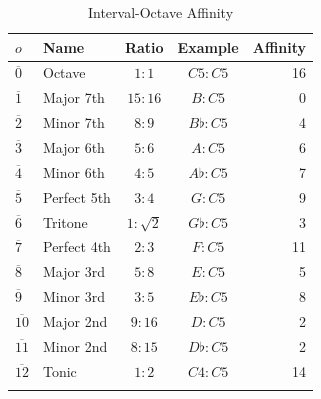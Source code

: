 \documentclass[sn-mathphys]{sn-jnl}%
\begin{document}
\begin{table}[h]
  \begin{center}
    \begin{minipage}{174pt}
      \caption{Interval-Octave Affinity}\label{tab1}%
      \begin{tabular}{@{}llccr@{}}
        \toprule
        $o$ \footnotemark[1] & Name  & Ratio \footnotemark[2] & Example & Affinity  \\
        \midrule
        $\overline{0}$ & Octave & $1:1$ & $C5:C5$ & 16 \\
        $\overline{1}$ & Major 7th & $15:16$ & $B:C5$ & 0 \\
        $\overline{2}$ & Minor 7th & $8:9$ & $B\flat:C5$ & 4 \\
        $\overline{3}$ & Major 6th & $5:6$ & $A:C5$ & 6 \\
        $\overline{4}$ & Minor 6th & $4:5$ & $A\flat:C5$ & 7 \\
        $\overline{5}$ & Perfect 5th & $3:4$ & $G:C5$ & 9 \\
        $\overline{6}$ & Tritone \footnotemark[3] & $1:\sqrt{2} $ & $G\flat:C5$ & 3 \\
        $\overline{7}$ & Perfect 4th & $2:3$ & $F:C5$ & 11 \\
        $\overline{8}$ & Major 3rd & $5:8$ & $E:C5$ & 5 \\
        $\overline{9}$ & Minor 3rd & $3:5$ & $E\flat:C5$ & 8 \\
        $\overline{10}$ & Major 2nd & $9:16$ & $D:C5$ & 2 \\
        $\overline{11}$ & Minor 2nd & $8:15$ & $D\flat:C5$ & 2 \\
        $\overline{12}$ & Tonic & $1:2$ & $C4:C5$ & 14 \\
        \botrule
      \end{tabular}
    \end{minipage}
  \end{center}
\end{table}
\end{document}
